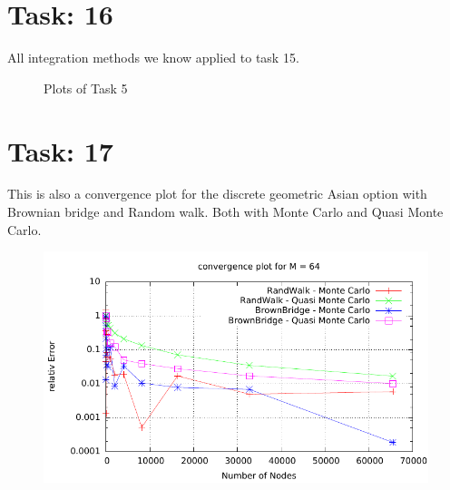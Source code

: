 \documentclass{article}
\begin{document}
\section*{Task: 16}
All integration methods we know applied to task 15.
\begin{figure} [htbp]
\caption{Plots of Task 5} 
\end{figure} 
%

\section*{Task: 17}
This is also a convergence plot for the discrete geometric Asian option with Brownian bridge and Random walk. Both with Monte Carlo and Quasi Monte Carlo.
\begin{figure}[htbp]
  \centering
     \includegraphics[width=1.0\textwidth]{../Task17/sh3_task17_convergencePlot.pdf}
\end{figure}
\end{document}
